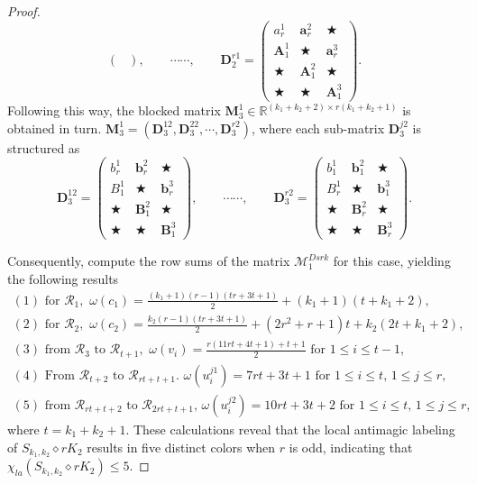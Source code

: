 \documentclass[12pt]{article}
\begin{document}
\begin{proof}
$$\begin{pmatrix}
\end{pmatrix},
\quad\quad\cdots\cdots,\quad\quad
\boldsymbol{D}^{r1}_{2}=\begin{pmatrix}
{a}_{r}^{1} &\boldsymbol{a}_{r}^{2} &\bigstar\\[2pt]
\boldsymbol{A}_{1}^{1}&\bigstar&\boldsymbol{a}_{r}^{3}\\
\bigstar &\boldsymbol{A}_{1}^{2}&\bigstar\\
\bigstar&\bigstar&\boldsymbol{A}_{1}^{3}
\end{pmatrix}.$$
Following this way, the blocked matrix $\boldsymbol{M}_{3}^{1}\in \mathbb{R}^{(k_{1}+k_{2}+2)\times r(k_{1}+k_{2}+1)}$ is obtained in turn.
$\boldsymbol{M}_{3}^{1} =(\boldsymbol{D}^{12}_{3},\boldsymbol{D}^{22}_{3},\cdots,\boldsymbol{D}^{r2}_{3})$, where each sub-matrix $\boldsymbol{D}^{j2}_{3}$ is structured as
$$\boldsymbol{D}^{12}_{3}=\begin{pmatrix}
{b}_{r}^{1} &\boldsymbol{b}_{r}^{2} &\bigstar\\[2pt]
{B}_{1}^{1}&\bigstar&\boldsymbol{b}_{r}^{3}\\
\bigstar &\boldsymbol{B}_{1}^{2}&\bigstar\\
\bigstar&\bigstar&\boldsymbol{B}_{1}^{3}
\end{pmatrix},
\quad\quad\cdots\cdots,\quad\quad
\boldsymbol{D}^{r2}_{3}=\begin{pmatrix}
{b}_{1}^{1} &\boldsymbol{b}_{1}^{2} &\bigstar\\[2pt]
{B}_{r}^{1}&\bigstar&\boldsymbol{b}_{1}^{3}\\
\bigstar &\boldsymbol{B}_{r}^{2}&\bigstar\\
\bigstar&\bigstar&\boldsymbol{B}_{r}^{3}
\end{pmatrix}.$$

Consequently, compute the row sums of the matrix $\boldsymbol{\mathcal{M}}^{Dsrk}_{1}$ for this case, yielding the following results
\begin{equation*}
  \begin{array}{l}
(1)\text{ for $\mathcal{R}_{1}$},\,\,\omega(c_{1})=\frac{(k_{1}+1)(r-1)(tr+3t+1)}{2}+(k_{1}+1)(t+k_{1}+2),\\[6pt]
(2)\text{ for $\mathcal{R}_{2}$},\,\,\omega(c_{2})=\frac{k_{2}(r-1)(tr+3t+1)}{2}+(2r^{2}+r+1)t+k_{2}(2t+k_{1}+2),\\[6pt]
(3)\text{ from $\mathcal{R}_{3}$ to $\mathcal{R}_{t+1}$},\,\,\omega(v_{i})=\frac{r(11rt+4t+1)+t+1}{2} \,\,\text{for $1\leq i\leq t-1$},\\[6pt]
(4)\text{ From $\mathcal{R}_{t+2}$ to $\mathcal{R}_{rt+t+1}$.}\,\,\omega(u_{i}^{j1})=7rt+3t+1 \,\,\text{for $1\leq i\leq t$, $1\leq j\leq r$},\\[4pt]
(5)\text{ from $\mathcal{R}_{rt+t+2}$ to $\mathcal{R}_{2rt+t+1}$,}\,\,\omega(u_{i}^{j2})=10rt+3t+2 \,\,\text{for $1\leq i\leq t$, $1\leq j\leq r$},
\end{array}
\end{equation*}
where $t=k_{1}+k_{2}+1$. These calculations reveal that the local antimagic labeling of $S_{k_{1},k_{2}}\diamond rK_{2}$ results in five distinct colors when $r$ is odd, indicating that $\chi_{la}(S_{k_{1},k_{2}}\diamond rK_{2})\leq 5$.


\end{proof}
\end{document}

